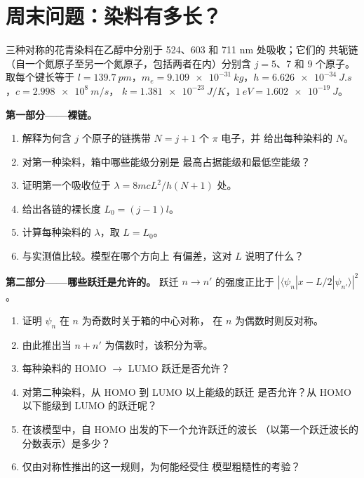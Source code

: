 \section{周末问题：染料有多长？}

\begin{problem}
\label{pb:b3:quantum-model-systems:1}
三种对称的花青染料在乙醇中分别于 524、603 和 711 nm 处吸收；它们的
共轭链（自一个氮原子至另一个氮原子，包括两者在内）分别含 $j = 5$、7
和 9 个原子。取每个键长等于 $l = \qty{139.7}{pm}$，$m_e =
\qty{9.109e-31}{kg}$，$h = \qty{6.626e-34}{J.s}$，$c = \qty{2.998e8}{m/s}$，
$k = \qty{1.381e-23}{J/K}$，$\qty{1}{eV} = \qty{1.602e-19}{J}$。

\medskip\noindent\textbf{第一部分——裸链。}
\begin{enumerate}
  \item 解释为何含 $j$ 个原子的链携带 $N = j + 1$ 个 $\pi$ 电子，并
        给出每种染料的 $N$。
  \item 对第一种染料，箱中哪些能级分别是
        最高占据能级和最低空能级？
  \item 证明第一个吸收位于 $\lambda = 8mcL^2/h(N+1)$ 处。
  \item 给出各链的裸长度 $L_0 = (j - 1)l$。
  \item 计算每种染料的 $\lambda$，取 $L = L_0$。
  \item 与实测值比较。模型在哪个方向上
        有偏差，这对 $L$ 说明了什么？
\end{enumerate}

\medskip\noindent\textbf{第二部分——哪些跃迁是允许的。}
跃迁 $n \to n'$ 的强度正比于 $|\langle
\psi_n|x - L/2|\psi_{n'}\rangle|^2$。
\begin{enumerate}[resume]
  \item 证明 $\psi_n$ 在 $n$ 为奇数时关于箱的中心对称，
        在 $n$ 为偶数时则反对称。
  \item 由此推出当 $n + n'$ 为偶数时，该积分为零。
  \item 每种染料的 HOMO $\to$ LUMO 跃迁是否允许？
  \item 对第二种染料，从 HOMO 到 LUMO 以上能级的跃迁
        是否允许？从 HOMO 以下能级到 LUMO 的跃迁呢？
  \item 在该模型中，自 HOMO 出发的下一个允许跃迁的波长
        （以第一个跃迁波长的分数表示）是多少？
  \item 仅由对称性推出的这一规则，为何能经受住
        模型粗糙性的考验？
\end{enumerate}


\end{problem}
